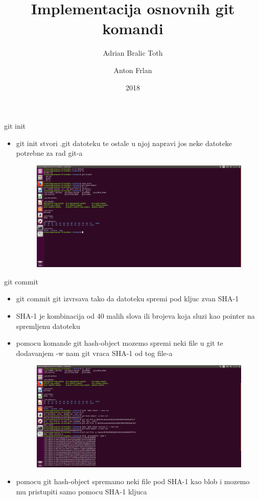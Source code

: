 \documentclass[]{beamer}
\title{Implementacija osnovnih git komandi}
\author{Adrian Bralic Toth \and Anton Frlan}
\institute{Tehnički Fakultet Rijeka}
\date{2018}
\begin{document}
\frame{\titlepage}

\begin{frame}{git init}

\begin{itemize}
	\setlength\itemsep{1em}
	\item git init stvori .git datoteku te ostale u njoj napravi jos neke datoteke potrebne za rad git-a
	\begin{figure}
\centering
\includegraphics[scale=.48]{./slike/git_datoteka.jpg}
\end{figure}
\end{itemize}

\end{frame}


\begin{frame}{git commit}

\begin{itemize}
	\setlength\itemsep{1.5em}
	\item git commit git izvrsava tako da datoteku spremi pod kljuc zvan SHA-1
	\item SHA-1 je kombinacija od 40 malih slova ili brojeva koja sluzi kao pointer na spremljenu datoteku
	\item pomocu komande git hash-object mozemo spremi neki file u git te dodavanjem -w nam git vraca SHA-1 od tog file-a
	\begin{figure}
\centering
\includegraphics[scale=.48]{./slike/druga_slika.jpg}
\end{figure}
	\item pomocu git hash-object spremamo neki file pod SHA-1 kao blob i mozemo mu pristupiti samo pomocu SHA-1 kljuca
\end{itemize}

\end{frame}
\end{document}
